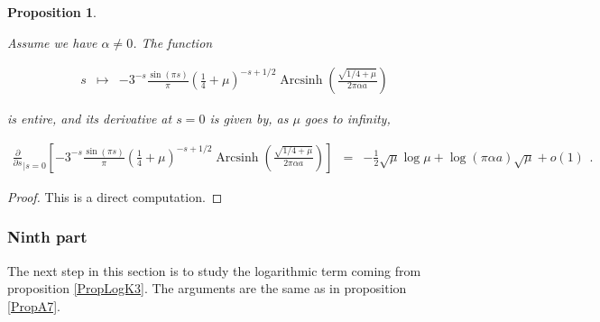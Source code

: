 \documentclass{jams-l}
\newtheorem{proposition}[theorem]{Proposition}
\theoremstyle{definition}
\theoremstyle{remark}
\numberwithin{equation}{section}
\DeclareMathOperator{\arcsinh}{Arcsinh}
\begin{document}
            \begin{proposition}
            \label{PropA8-0}
            
                Assume we have $\alpha \neq 0$. The function
                
                \[ \begin{array}{lll}
                        s & \longmapsto & - 3^{-s} \frac{\sin \left( \pi s \right)}{\pi} \left( \frac{1}{4} + \mu \right)^{- s + 1/2} \arcsinh \left(  \frac{\sqrt{1/4 + \mu}}{2 \pi \alpha a} \right)
                    \end{array} \]
                
                \noindent is entire, and its derivative at $s = 0$ is given by, as $\mu$ goes to infinity,
                
                \[ \begin{array}{lll}
                        \scriptstyle \frac{\partial}{\partial s}_{\left \vert s = 0 \right.} \left[ - 3^{-s} \frac{\sin \left( \pi s \right)}{\pi} \left( \frac{1}{4} + \mu \right)^{- s + 1/2} \arcsinh \left(  \frac{\sqrt{1/4 + \mu}}{2 \pi \alpha a} \right) \right] & \scriptstyle = & \scriptstyle - \frac{1}{2} \sqrt{\mu} \log \mu + \log \left( \pi \alpha a \right) \sqrt{\mu} + o \left( 1 \right)
                    \end{array} . \]
            
            \end{proposition}
            
            \begin{proof}
            
                This is a direct computation.
            
            \end{proof}
            
            
        \subsubsection*{\textbf{Ninth part}}
        \label{ANinthPart}
        
            The next step in this section is to study the logarithmic term coming from proposition \ref{PropLogK3}. The arguments are the same as in proposition \ref{PropA7}.
            
\end{document}

